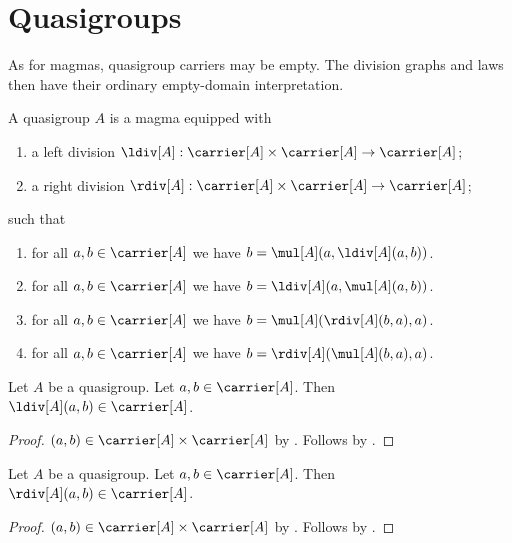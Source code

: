 

\section{Quasigroups}

As for magmas, quasigroup carriers may be empty. The division graphs and laws
then have their ordinary empty-domain interpretation.

\begin{struct}\label{quasigroup}
    A quasigroup $A$ is a magma equipped with
    \begin{enumerate}
        \item\label{quasigroup_ldiv_graph}
            a left division
            $\ldiv[A]:\carrier[A]\times\carrier[A]\to\carrier[A]$;
        \item\label{quasigroup_rdiv_graph}
            a right division
            $\rdiv[A]:\carrier[A]\times\carrier[A]\to\carrier[A]$;
    \end{enumerate}
    such that
    \begin{enumerate}
        \item\label{quasigroup_mul_ldiv}
            for all $a,b\in\carrier[A]$ we have
                $b=\mul[A](a,\ldiv[A](a,b))$.
        \item\label{quasigroup_ldiv_mul}
            for all $a,b\in\carrier[A]$ we have
                $b=\ldiv[A](a,\mul[A](a,b))$.
        \item\label{quasigroup_rdiv_mul}
            for all $a,b\in\carrier[A]$ we have
                $b=\mul[A](\rdiv[A](b,a),a)$.
        \item\label{quasigroup_mul_rdiv}
            for all $a,b\in\carrier[A]$ we have
                $b=\rdiv[A](\mul[A](b,a),a)$.
    \end{enumerate}
\end{struct}

\begin{proposition}\label{quasigroup_ldiv_type}
    Let $A$ be a quasigroup.
    Let $a,b\in\carrier[A]$.
    Then $\ldiv[A](a,b)\in\carrier[A]$.
\end{proposition}
\begin{proof}
    $(a,b)\in\carrier[A]\times\carrier[A]$
        by .
    Follows by .
\end{proof}

\begin{proposition}\label{quasigroup_rdiv_type}
    Let $A$ be a quasigroup.
    Let $a,b\in\carrier[A]$.
    Then $\rdiv[A](a,b)\in\carrier[A]$.
\end{proposition}
\begin{proof}
    $(a,b)\in\carrier[A]\times\carrier[A]$
        by .
    Follows by .
\end{proof}

